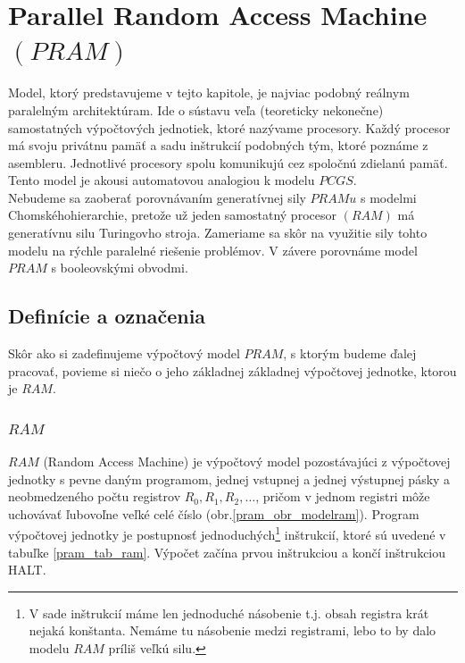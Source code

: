 \chapter{Parallel Random Access Machine $(PRAM)$}

Model, ktorý predstavujeme v tejto kapitole, je najviac podobný
reálnym paralelným architektúram. Ide o sústavu veľa (teoreticky
nekonečne) samostatných výpočtových jednotiek, ktoré nazývame
procesory. Každý procesor má svoju privátnu pamäť a sadu
inštrukcií podobných tým, ktoré poznáme z asembleru. Jednotlivé
procesory spolu komunikujú cez spoločnú zdielanú pamäť. Tento
model je akousi automatovou analogiou k modelu $PCGS$.
\\ Nebudeme sa zaoberať porovnávaním generatívnej sily $PRAMu$ s
modelmi Chomského\newline hierarchie, pretože už jeden samostatný
procesor $(RAM)$ má generatívnu silu Turingovho stroja. Zameriame
sa skôr na využitie sily tohto modelu na rýchle paralelné riešenie
problémov. V závere porovnáme model $PRAM$ s booleovskými obvodmi.

\section{Definície a označenia}

Skôr ako si zadefinujeme výpočtový model $PRAM$, s ktorým budeme
ďalej pracovať, povieme si niečo o jeho základnej základnej
výpočtovej jednotke, ktorou je $RAM$.

\subsection{$RAM$}

\begin{definicia}
$RAM$ (Random Access Machine) je výpočtový model pozostávajúci z
výpočtovej jednotky s pevne daným programom, jednej vstupnej a
jednej výstupnej pásky a neobmedzeného počtu registrov
$R_0,R_1,R_2,\dots$, pričom v jednom registri môže uchovávať
ľubovoľne veľké celé číslo (obr.\ref{pram_obr_modelram}). Program
výpočtovej jednotky je postupnosť jednoduchých\footnote{V sade
inštrukcií máme len jednoduché násobenie t.j. obsah registra krát
nejaká konštanta. Nemáme tu násobenie medzi registrami, lebo to by
dalo modelu $RAM$ príliš veľkú silu.} inštrukcií, ktoré sú uvedené
v tabuľke \ref{pram_tab_ram}. Výpočet začína prvou inštrukciou a
končí inštrukciou HALT.
\end{definicia}

